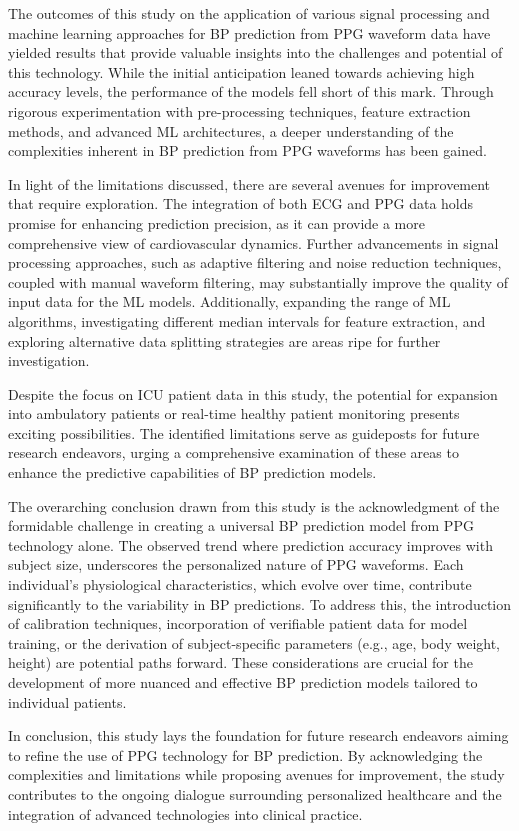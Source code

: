 The outcomes of this study on the application of various signal processing and machine learning approaches for BP prediction from PPG waveform data have yielded results
that provide valuable insights into the challenges and potential of this technology.
While the initial anticipation leaned towards achieving high accuracy levels, the performance of the models fell short of this mark.
Through rigorous experimentation with pre-processing techniques, feature extraction methods, and advanced ML architectures,
a deeper understanding of the complexities inherent in BP prediction from PPG waveforms has been gained.

In light of the limitations discussed, there are several avenues for improvement that require exploration.
The integration of both ECG and PPG data holds promise for enhancing prediction precision, as it can provide a more comprehensive view of cardiovascular dynamics.
Further advancements in signal processing approaches, such as adaptive filtering and noise reduction techniques, coupled with manual waveform filtering,
may substantially improve the quality of input data for the ML models.
Additionally, expanding the range of ML algorithms, investigating different median intervals for feature extraction,
and exploring alternative data splitting strategies are areas ripe for further investigation.

Despite the focus on ICU patient data in this study, the potential for expansion into ambulatory patients or real-time healthy patient monitoring presents exciting possibilities.
The identified limitations serve as guideposts for future research endeavors, urging a comprehensive examination of these areas to enhance the predictive capabilities of BP prediction models.

The overarching conclusion drawn from this study is the acknowledgment of the formidable challenge in creating a universal BP prediction model from PPG technology alone.
The observed trend where prediction accuracy improves with subject size, underscores the personalized nature of PPG waveforms.
Each individual's physiological characteristics, which evolve over time, contribute significantly to the variability in BP predictions.
To address this, the introduction of calibration techniques, incorporation of verifiable patient data for model training,
or the derivation of subject-specific parameters (e.g., age, body weight, height) are potential paths forward.
These considerations are crucial for the development of more nuanced and effective BP prediction models tailored to individual patients.

In conclusion, this study lays the foundation for future research endeavors aiming to refine the use of PPG technology for BP prediction.
By acknowledging the complexities and limitations while proposing avenues for improvement,
the study contributes to the ongoing dialogue surrounding personalized healthcare and the integration of advanced technologies into clinical practice.
